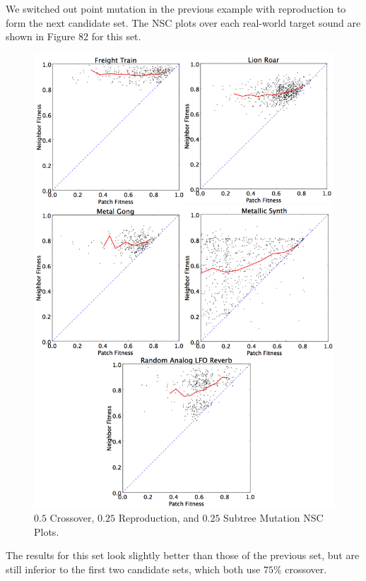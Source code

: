 \documentclass[12pt]{report} 	%
\numberwithin{figure}{chapter}
\numberwithin{table}{chapter}
\numberwithin{equation}{chapter}
\begin{document}
\begin{flushleft}
We switched out point mutation in the previous example with reproduction to form the next candidate set. The NSC plots over each real-world target sound are shown in Figure 82 for this set.
\begin{figure}[h!]
\begin{center}
\includegraphics[scale=0.15]{GOPS_Param6}
\caption[$0.5$ Crossover, $0.25$ reproduction, and $0.25$ subtree mutation NSC plots]{$0.5$ Crossover, $0.25$ Reproduction, and $0.25$ Subtree Mutation NSC Plots.}
\end{center}
\end{figure}

The results for this set look slightly better than those of the previous set, but are still inferior to the first two candidate sets, which both use $75\%$ crossover.


\end{flushleft}
\end{document}
